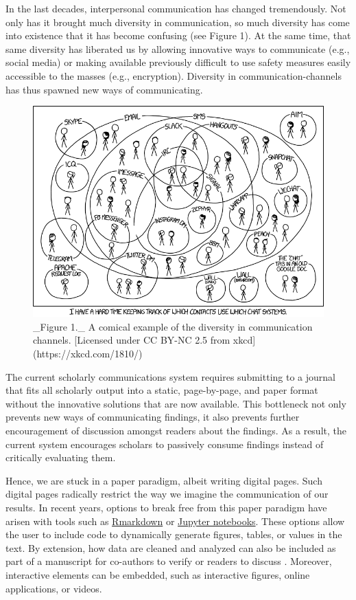 \documentclass[]{tufte-book}
\begin{document}
In the last decades, interpersonal communication has changed
tremendously. Not only has it brought much diversity in communication,
so much diversity has come into existence that it has become confusing
(see Figure 1). At the same time, that same diversity has liberated us
by allowing innovative ways to communicate (e.g., social media) or
making available previously difficult to use safety measures easily
accessible to the masses (e.g., encryption). Diversity in
communication-channels has thus spawned new ways of communicating.

\begin{figure}

{\centering \includegraphics[width=0.6\linewidth]{figs/xkcd_1810-cc-by-nc-2_5} 

}

\caption[_Figure 1._ A comical example of the diversity in communication channels]{_Figure 1._ A comical example of the diversity in communication channels. [Licensed under CC BY-NC 2.5 from xkcd](https://xkcd.com/1810/)}\label{fig:xkcd-1810}
\end{figure}

The current scholarly communications system requires submitting to a
journal that fits all scholarly output into a static, page-by-page, and
paper format without the innovative solutions that are now available.
This bottleneck not only prevents new ways of communicating findings, it
also prevents further encouragement of discussion amongst readers about
the findings. As a result, the current system encourages scholars to
passively consume findings instead of critically evaluating them.

Hence, we are stuck in a paper paradigm, albeit writing digital pages.
Such digital pages radically restrict the way we imagine the
communication of our results. In recent years, options to break free
from this paper paradigm have arisen with tools such as
\href{http://rmarkdown.rstudio.com/}{Rmarkdown} or
\href{https://jupyter.org/}{Jupyter notebooks}. These options allow the
user to include code to dynamically generate figures, tables, or values
in the text. By extension, how data are cleaned and analyzed can also be
included as part of a manuscript for co-authors to verify or readers to
discuss \citep[see also][]{elife-rmd}. Moreover, interactive elements
can be embedded, such as interactive figures, online applications, or
videos.
\end{document}
